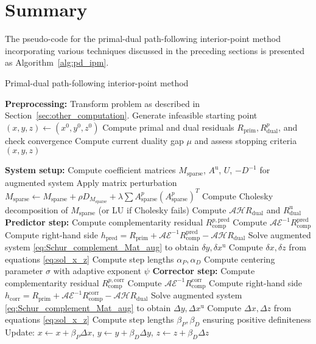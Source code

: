 \section{Summary}
The pseudo-code for the primal-dual path-following interior-point method incorporating various techniques discussed in the preceding sections is presented as Algorithm~\ref{alg:pd_ipm}. 
\begin{algorithm}
\caption{Primal-dual path-following interior-point method}
\label{alg:pd_ipm}
\begin{algorithmic}[1]
\STATE \textbf{Preprocessing:} Transform problem as described in Section~\ref{sec:other_computation}. 
Generate infeasible starting point $(x,y,z) \leftarrow (x^0, y^0, z^0)$
    \STATE Compute primal and dual residuals $R_{\text{prim}}, R_{\text{dual}}^p$, and check convergence
    \STATE Compute current duality gap $\mu$ and assess stopping criteria
        \RETURN $(x, y, z)$
    \ENDIF
    
    \STATE \textbf{System setup:}
    \STATE Compute coefficient matrices $M_{\text{sparse}}$, $A^{\text{u}}$, $U$, $-D^{-1}$ for augmented system
    \STATE Apply matrix perturbation $M_{\text{sparse}} \leftarrow M_{\text{sparse}} + \rho D_{M_{\text{sparse}}} + \lambda \sum A^p_{\text{sparse}}(A^p_{\text{sparse}})^T$
    \STATE Compute Cholesky decomposition of $M_{\text{sparse}}$ (or LU if Cholesky fails)
    \STATE Compute $\mathcal{A}\mathcal{H}R_{\text{dual}}$ and $R^{\text{u}}_{\text{dual}}$
    \STATE 
    \STATE \textbf{Predictor step:}
    \STATE Compute complementarity residual $R_{\text{comp}}^{p,\text{pred}}$
    \STATE Compute $\mathcal{A}\mathcal{E}^{-1}R_{\text{comp}}^{\text{pred}}$ 
    \STATE Compute right-hand side $h_{\text{pred}} = R_{\text{prim}} + \mathcal{A}\mathcal{E}^{-1}R_{\text{comp}}^{\text{pred}} - \mathcal{A}\mathcal{H}R_{\text{dual}}$
    \STATE Solve augmented system \eqref{eq:Schur_complement_Mat_aug} to obtain $\delta y, \delta x^{\text{u}}$
    \STATE Compute $\delta x, \delta z$ from equations \eqref{eq:sol_x_z}
    \STATE Compute step lengths $\alpha_{P}, \alpha_{D}$
    \STATE Compute centering parameter $\sigma$ with adaptive exponent $\psi$
    \STATE
    \STATE \textbf{Corrector step:}
    \STATE Compute complementarity residual $R_{\text{comp}}^{p,\text{corr}}$
    \STATE Compute $\mathcal{A}\mathcal{E}^{-1}R_{\text{comp}}^{\text{corr}}$
    \STATE Compute right-hand side $h_{\text{corr}} = R_{\text{prim}} + \mathcal{A}\mathcal{E}^{-1}R_{\text{comp}}^{\text{corr}} - \mathcal{A}\mathcal{H}R_{\text{dual}}$
    \STATE Solve augmented system \eqref{eq:Schur_complement_Mat_aug} to obtain $\Delta y, \Delta x^{\text{u}}$
    \STATE Compute $\Delta x, \Delta z$ from equations \eqref{eq:sol_x_z}
    \STATE Compute step lengths $\beta_P, \beta_D$ ensuring positive definiteness
    \STATE Update: $x \leftarrow x + \beta_P \Delta x$, $y \leftarrow y + \beta_D \Delta y$, $z \leftarrow z + \beta_D \Delta z$


\end{algorithmic}
\end{algorithm}
